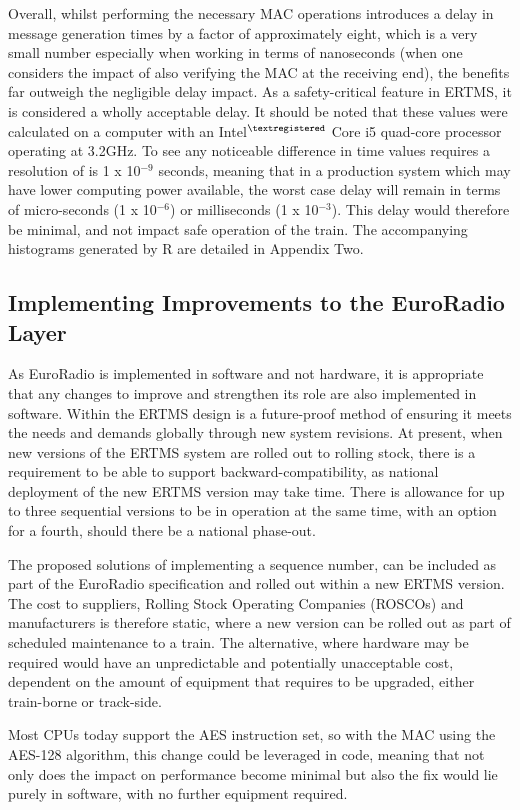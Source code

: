 \documentclass[twoside,11pt,a4paper]{article}
\begin{document}
Overall, whilst performing the necessary MAC operations introduces a delay in message generation times by a factor of approximately eight, which is a very small number especially when working in terms of nanoseconds (when one considers the impact of also verifying the MAC at the receiving end), the benefits far outweigh the negligible delay impact. As a safety-critical feature in ERTMS, it is considered a wholly acceptable delay. It should be noted that these values were calculated on a computer with an Intel$^{\textregistered}$ Core i5 quad-core processor operating at 3.2GHz. To see any noticeable difference in time values requires a resolution of is 1 x 10$^{-9}$ seconds, meaning that in a production system which may have lower computing power available, the worst case delay will remain in terms of micro-seconds (1 x 10$^{-6}$) or milliseconds (1 x 10$^{-3}$). This delay would therefore be minimal, and not impact safe operation of the train. The accompanying histograms generated by R are detailed in Appendix Two.

\subsection{Implementing Improvements to the EuroRadio Layer}
As EuroRadio is implemented in software and not hardware, it is appropriate that any changes to improve and strengthen its role are also implemented in software. Within the ERTMS design is a future-proof method of ensuring it meets the needs and demands globally through new system revisions. At present, when new versions of the ERTMS system are rolled out to rolling stock, there is a requirement to be able to support backward-compatibility, as national deployment of the new ERTMS version may take time. There is allowance for up to three sequential versions to be in operation at the same time, with an option for a fourth, should there be a national phase-out.

The proposed solutions of implementing a sequence number, can be included as part of the EuroRadio specification and rolled out within a new ERTMS version. The cost to suppliers, Rolling Stock Operating Companies (ROSCOs) and manufacturers is therefore static, where a new version can be rolled out as part of scheduled maintenance to a train. The alternative, where hardware may be required would have an unpredictable and potentially unacceptable cost, dependent on the amount of equipment that requires to be upgraded, either train-borne or track-side.

Most CPUs today support the AES instruction set, so with the MAC using the AES-128 algorithm, this change could be leveraged in code, meaning that not only does the impact on performance become minimal but also the fix would lie purely in software, with no further equipment required.
\end{document}
